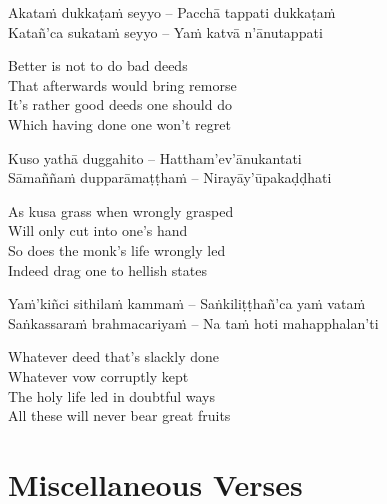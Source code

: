 \begin{verses}
  Akataṁ dukkaṭaṁ seyyo – Pacchā tappati dukkaṭaṁ\\
  Katañ'ca sukataṁ seyyo – Yaṁ katvā n'ānutappati
\end{verses}

\begin{english-verses}
  Better is not to do bad deeds\\
  That afterwards would bring remorse\\
  It's rather good deeds one should do\\
  Which having done one won't regret
\end{english-verses}

\begin{verses}
  Kuso yathā duggahito – Hattham'ev'ānukantati\\
  Sāmaññaṁ dupparāmaṭṭhaṁ – Nirayāy'ūpakaḍḍhati
\end{verses}

\begin{english-verses}
  As kusa grass when wrongly grasped\\
  Will only cut into one's hand\\
  So does the monk's life wrongly led\\
  Indeed drag one to hellish states
\end{english-verses}

\begin{verses}
  Yaṁ'kiñci sithilaṁ kammaṁ – Saṅkiliṭṭhañ'ca yaṁ vataṁ\\
  Saṅkassaraṁ brahmacariyaṁ – Na taṁ hoti mahapphalan'ti
\end{verses}

\begin{english-verses}
  Whatever deed that's slackly done\\
  Whatever vow corruptly kept\\
  The holy life led in doubtful ways\\
  All these will never bear great fruits
\end{english-verses}

\suttaRef{[SN 2.8]}


\section{Miscellaneous Verses}
\label{misc-verses}

